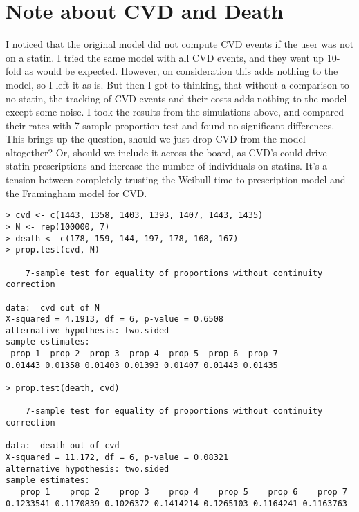 \documentclass{article}
\begin{document}
\section{Note about CVD and Death}

I noticed that the original model did not compute CVD events if the user was not on a statin. I tried the same model with all CVD events, and they went up 10-fold as would be expected. However, on consideration this adds nothing to the model, so I left it as is. But then I got to thinking, that without a comparison to no statin, the tracking of CVD events and their costs adds nothing to the model except some noise. I took the results from the simulations above, and compared their rates with 7-sample proportion test and found no significant differences. This brings up the question, should we just drop CVD from the model altogether? Or, should we include it across the board, as CVD's could drive statin prescriptions and increase the number of individuals on statins. It's a tension between completely trusting the Weibull time to prescription model and the Framingham model for CVD.

\begin{verbatim}
> cvd <- c(1443, 1358, 1403, 1393, 1407, 1443, 1435)
> N <- rep(100000, 7)
> death <- c(178, 159, 144, 197, 178, 168, 167)
> prop.test(cvd, N)

	7-sample test for equality of proportions without continuity correction

data:  cvd out of N
X-squared = 4.1913, df = 6, p-value = 0.6508
alternative hypothesis: two.sided
sample estimates:
 prop 1  prop 2  prop 3  prop 4  prop 5  prop 6  prop 7 
0.01443 0.01358 0.01403 0.01393 0.01407 0.01443 0.01435 

> prop.test(death, cvd)

	7-sample test for equality of proportions without continuity correction

data:  death out of cvd
X-squared = 11.172, df = 6, p-value = 0.08321
alternative hypothesis: two.sided
sample estimates:
   prop 1    prop 2    prop 3    prop 4    prop 5    prop 6    prop 7 
0.1233541 0.1170839 0.1026372 0.1414214 0.1265103 0.1164241 0.1163763
\end{verbatim}
\end{document}
